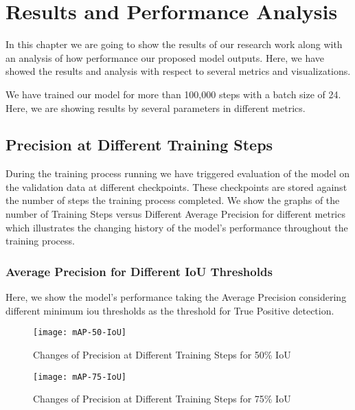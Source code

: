 \chapter{Results and Performance Analysis}
    In this chapter we are going to show the results of our research work along with an analysis of how performance our proposed model outputs. Here, we have showed the results and analysis with respect to several metrics and visualizations.
    
    We have trained our model for more than 100,000 steps with a batch size of 24. Here, we are showing results by several parameters in different metrics.
    
    \section{Precision at Different Training Steps}
        During the training process running we have triggered evaluation of the model on the validation data at different checkpoints. These checkpoints are stored against the number of steps the training process completed.
        We show the graphs of the number of Training Steps versus Different Average Precision for different metrics which illustrates the changing history of the model's performance throughout the training process.
        
        \subsection{Average Precision for Different IoU Thresholds}
            Here, we show the model's performance taking the Average Precision considering different minimum \acrfull{iou} thresholds as the threshold for True Positive detection.
                        
            \begin{figure}
                \centering
                \texttt{[image: mAP-50-IoU]}
                \caption{Changes of Precision at Different Training Steps for 50\% IoU}
                \label{fig:precision_iou50}
            \end{figure}
            
            \begin{figure}
                \centering
                \texttt{[image: mAP-75-IoU]}
                \caption{Changes of Precision at Different Training Steps for 75\% IoU}
                \label{fig:precision_iou75}
            \end{figure}
            
